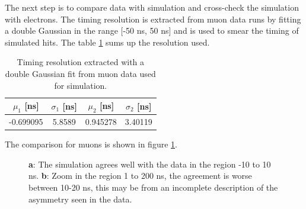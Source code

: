 \documentclass[twoside,a4paper,11pt]{article}
\begin{document}
The next step is to compare data with simulation and cross-check the simulation with electrons. The timing resolution is extracted from muon data runs by fitting a double Gaussian in the range [-50 ns, 50 ns] and is used to smear the timing of simulated hits. The table \ref{table:time_res_sim} sums up the resolution used.
\begin{table}[htbp]
\centering
  \begin{tabular}{@{} cccc @{}}
    \hline
    $\mu_{1}$ [ns] & $\sigma_{1}$ [ns] & $\mu_{2}$ [ns] & $\sigma_{2}$ [ns] \\ 
    \hline
    -0.699095 & 5.8589 & 0.945278 & 3.40119 \\
    \hline
  \end{tabular}
  \caption[Timing resolution extracted with a double Gaussian fit from muon data used for simulation.]{Timing resolution extracted with a double Gaussian fit from muon data used for simulation.\footnotemark[1]}
  \label{table:time_res_sim}
\end{table}
The comparison for muons is shown in figure \ref{fig:sim_data_muon}.
\begin{figure}[htbp]
	\hfill
	\caption[]{\textbf{a}: The simulation agrees well with the data in the region -10 to 10 ns. \textbf{b}: Zoom in the region 1 to 200 ns, the agreement is worse between 10-20 ns, this may be from an incomplete description of the asymmetry seen in the data.}
	\label{fig:sim_data_muon}
\end{figure}
\end{document}
